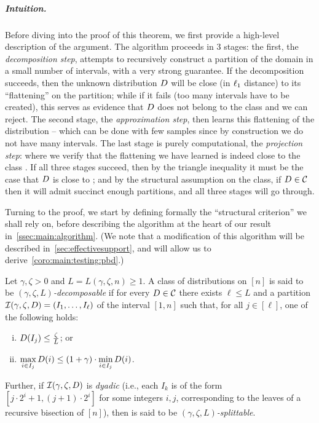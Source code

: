 \subparagraph{Intuition.} Before diving into the proof of this theorem, we first provide a high-level description of the argument. The algorithm proceeds in 3 stages: the first, the \emph{decomposition step}, attempts to recursively construct a partition of the domain in a small number of intervals, with a very strong guarantee. If the decomposition succeeds, then the unknown distribution $\D$ will be close (in $\lp[1]$ distance) to its ``flattening'' on the partition; while if it fails (too many intervals have to be created), this serves as evidence that $\D$ does not belong to the class and we can reject. The second stage, the \emph{approximation step}, then learns this flattening of the distribution -- which can be done with few samples since by construction we do not have many intervals. The last stage is purely computational, the \emph{projection step}: where we verify that the flattening we have learned is indeed close to the class \class. If all three stages succeed, then by the triangle inequality it must be the case that $\D$ is close to \class; and by the structural assumption on the class, if $\D\in\class$ then it will admit succinct enough partitions, and all three stages will go through.\medskip

\noindent Turning to the proof, we start by defining formally the ``structural criterion'' we shall rely on, before describing the algorithm at the heart of our result in~\cref{ssec:main:algorithm}. (We note that a modification of this algorithm will be described in~\cref{sec:effectivesupport}, and will allow us to derive~\cref{coro:main:testing:pbd}.)

\begin{definition}[Decompositions]\label{def:struct:dec:split}
Let $\gamma,  \zeta > 0$ and $L=L(\gamma,\zeta,n)\geq 1$.  A class of distributions \class on $[n]$ is said to be \emph{$(\gamma,\zeta,L)$-decomposable} if for every $\D\in\class$ there exists $\ell \leq L$ and a partition $\mathcal{I}(\gamma,\zeta,\D)=(I_1,\dots,I_\ell)$ of the interval $[1,n]$ such that, for all $j\in[\ell]$, one of the following holds:
\begin{enumerate}[(i)]
  \item\label{def:struct:item:light}  $\D(I_j) \leq \frac{\zeta}{L}$; or 
  \item\label{def:struct:item:flat} $\displaystyle \max_{i \in I_j} \D(i)\leq  (1+\gamma)\cdot \min_{i \in I_j} \D(i)$.
\end{enumerate}
Further, if $\mathcal{I}(\gamma,\zeta,\D)$ is \emph{dyadic} (i.e., each $I_k$ is of the form $[j\cdot 2^i+1,(j+1)\cdot 2^i]$ for some integers $i,j$, corresponding to the leaves of a recursive bisection of $[n]$), then \class is said to be \emph{$(\gamma,\zeta,L)$-splittable}.
\end{definition}

